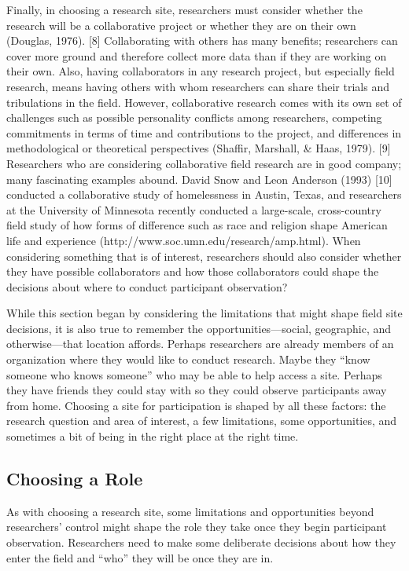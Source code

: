 Finally, in choosing a research site, researchers must consider whether the research will be a collaborative project or whether they are on their own (Douglas, 1976). [8] Collaborating with others has many benefits; researchers can cover more ground and therefore collect more data than if they are working on their own. Also, having collaborators in any research project, but especially field research, means having others with whom researchers can share their trials and tribulations in the field. However, collaborative research comes with its own set of challenges such as possible personality conflicts among researchers, competing commitments in terms of time and contributions to the project, and differences in methodological or theoretical perspectives (Shaffir, Marshall, \& Haas, 1979). [9] Researchers who are considering collaborative field research are in good company; many fascinating examples abound. David Snow and Leon Anderson (1993) [10] conducted a collaborative study of homelessness in Austin, Texas, and researchers at the University of Minnesota recently conducted a large-scale, cross-country field study of how forms of difference such as race and religion shape American life and experience (http://www.soc.umn.edu/research/amp.html). When considering something that is of interest, researchers should also consider whether they have possible collaborators and how those collaborators could shape the decisions about where to conduct participant observation?

While this section began by considering the limitations that might shape field site decisions, it is also true to remember the opportunities—social, geographic, and otherwise—that location affords. Perhaps researchers are already members of an organization where they would like to conduct research. Maybe they ``know someone who knows someone'' who may be able to help access a site. Perhaps they have friends they could stay with so they could observe participants away from home. Choosing a site for participation is shaped by all these factors: the research question and area of interest, a few limitations, some opportunities, and sometimes a bit of being in the right place at the right time.

\subsection{Choosing a Role}

As with choosing a research site, some limitations and opportunities beyond researchers' control might shape the role they take once they begin participant observation. Researchers need to make some deliberate decisions about how they enter the field and ``who'' they will be once they are in.

